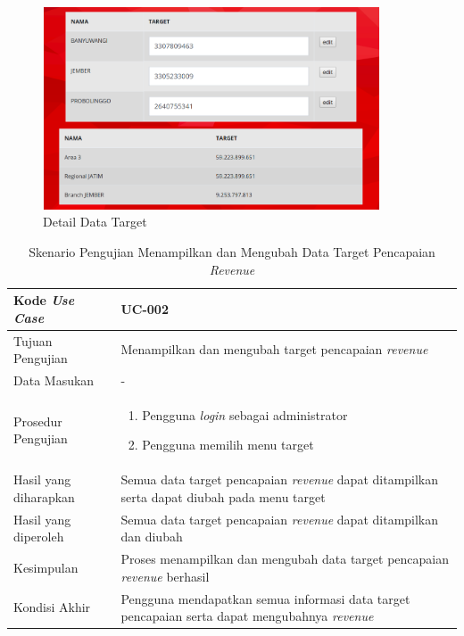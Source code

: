 \begin{figure}[h!]
	\centerline
	{\includegraphics[width=10cm,height=6cm]{bab6/detailHalamanTarget.png}}
	\caption{Detail Data Target}
	\label{figure:detailLihatTarget}
\end{figure}

\begin{table}[h!]
	\centering
	\begin{tabular}{|p{4cm}|p{6cm}|}
	\hline
	Kode \textit{Use Case} & UC-002\\ \hline
	Tujuan Pengujian & Menampilkan dan mengubah target pencapaian \textit{revenue}\\ \hline
	Data Masukan & - \\ \hline
	Prosedur Pengujian & 
		\begin{enumerate}
		\item Pengguna \textit{login} sebagai administrator
		\item Pengguna memilih menu target
		\end{enumerate}\\ \hline
	Hasil yang diharapkan & Semua data target pencapaian \textit{revenue} dapat ditampilkan serta dapat diubah pada menu target \\ \hline
	Hasil yang diperoleh & Semua data target pencapaian \textit{revenue} dapat ditampilkan dan diubah \\ \hline
	Kesimpulan & Proses menampilkan dan mengubah data target pencapaian \textit{revenue} berhasil\\ \hline
	Kondisi Akhir & Pengguna mendapatkan semua informasi data target pencapaian serta dapat mengubahnya \textit{revenue}\\ \hline
	\end{tabular}\caption{Skenario Pengujian Menampilkan dan Mengubah Data Target Pencapaian \textit{Revenue}}
	\label{tab:list_target}
\end{table}

